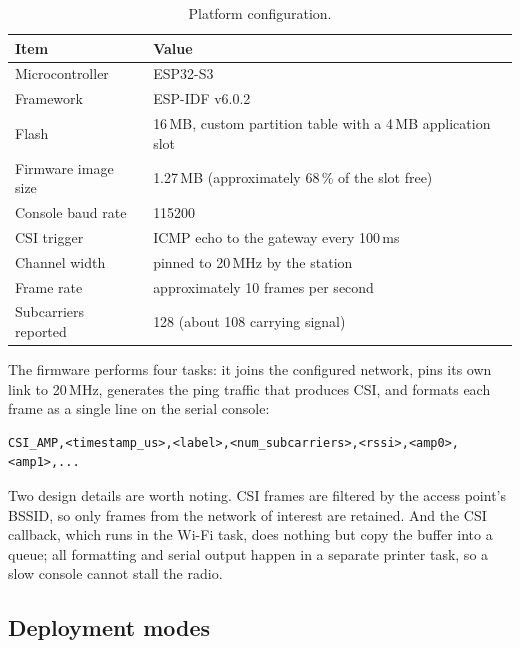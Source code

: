 \documentclass[11pt,a4paper]{article}
\begin{document}
\begin{table}[H]
\centering
\caption{Platform configuration.}
\begin{tabular}{@{}ll@{}}
\toprule
\textbf{Item} & \textbf{Value} \\
\midrule
Microcontroller        & ESP32-S3 \\
Framework              & ESP-IDF v6.0.2 \\
Flash                  & 16\,MB, custom partition table with a 4\,MB application slot \\
Firmware image size    & 1.27\,MB (approximately 68\,\% of the slot free) \\
Console baud rate      & 115200 \\
CSI trigger            & ICMP echo to the gateway every 100\,ms \\
Channel width          & pinned to 20\,MHz by the station \\
Frame rate             & approximately 10 frames per second \\
Subcarriers reported   & 128 (about 108 carrying signal) \\
\bottomrule
\end{tabular}
\end{table}

\noindent
The firmware performs four tasks: it joins the configured network, pins its own
link to 20\,MHz, generates the ping traffic that produces CSI, and formats each
frame as a single line on the serial console:

\begin{lstlisting}[caption={Serial line format emitted by the firmware.}]
CSI_AMP,<timestamp_us>,<label>,<num_subcarriers>,<rssi>,<amp0>,<amp1>,...
\end{lstlisting}

\noindent
Two design details are worth noting. CSI frames are filtered by the access
point's BSSID, so only frames from the network of interest are retained.
And the CSI callback, which runs in the Wi-Fi task, does nothing but copy the
buffer into a queue; all formatting and serial output happen in a separate
printer task, so a slow console cannot stall the radio.

\subsection{Deployment modes}
\end{document}
